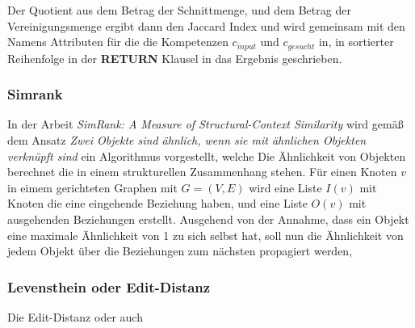 Der Quotient aus dem Betrag der Schnittmenge, und dem Betrag der Vereinigungsmenge ergibt dann den Jaccard Index und wird gemeinsam mit den Namens Attributen für die die Kompetenzen $c_{input}$ und $c_{gesucht}$  in, in sortierter Reihenfolge in der \textbf{RETURN} Klausel in das Ergebnis geschrieben.

\subsubsection{Simrank}

In der Arbeit \textit{SimRank: A Measure of Structural-Context Similarity} wird gemäß dem Ansatz \textit{Zwei Objekte sind ähnlich, wenn sie mit ähnlichen Objekten verknüpft sind} ein Algorithmus vorgestellt, welche Die Ähnlichkeit von Objekten berechnet die in einem strukturellen Zusammenhang stehen. Für einen Knoten $v$ in eimem gerichteten Graphen mit $G = (V,E) $ wird eine Liste $I(v)$ mit Knoten die eine eingehende Beziehung haben, und eine Liste $O(v)$ mit ausgehenden Beziehungen erstellt. Ausgehend von der Annahme, dass ein Objekt eine maximale Ähnlichkeit von 1 zu sich selbst hat, soll nun die Ähnlichkeit von jedem Objekt über die Beziehungen zum nächsten propagiert werden, 	

\subsubsection{Levensthein oder Edit-Distanz}

Die Edit-Distanz oder auch 


